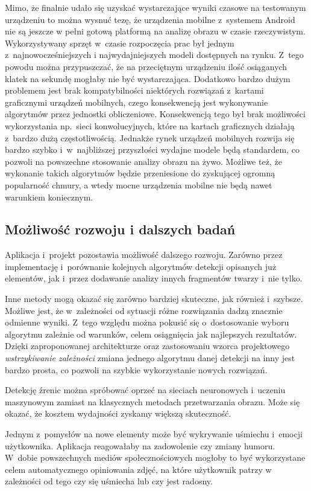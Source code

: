 Mimo, że finalnie udało się uzyskać wystarczające wyniki czasowe na testowanym urządzeniu to można wysnuć tezę, że urządzenia mobilne z~systemem Android nie są jeszcze w pełni gotową platformą na analizę obrazu w czasie rzeczywistym. Wykorzystywany sprzęt w~czasie rozpoczęcia prac był jednym z~najnowocześniejszych i najwydajniejszych modeli dostępnych na rynku. Z~tego powodu można przypuszczać, że na przeciętnym urządzeniu ilość osiąganych klatek na sekundę mogłaby nie być wystarczająca. Dodatkowo bardzo dużym problemem jest brak kompatybilności niektórych rozwiązań z~kartami graficznymi urządzeń mobilnych, czego konsekwencją jest wykonywanie algorytmów przez jednostki obliczeniowe. Konsekwencją tego był brak możliwości wykorzystania np.~sieci konwolucyjnych, które na kartach graficznych działają z~bardzo dużą częstotliwością. Jednakże rynek urządzeń mobilnych rozwija się bardzo szybko i~w~najbliższej przyszłości wydajne modele będą standardem, co pozwoli na powszechne stosowanie analizy obrazu na żywo. Możliwe też, że wykonanie takich algorytmów będzie przeniesione do zyskującej ogromną popularność chmury, a wtedy mocne urządzenia mobilne nie będą nawet warunkiem koniecznym.





\subsection{Możliwość rozwoju i dalszych badań}

Aplikacja i~projekt pozostawia możliwość dalszego rozwoju. Zarówno przez implementację i~porównanie kolejnych algorytmów detekcji opisanych już elementów, jak i~przez dodawanie analizy innych fragmentów twarzy i~nie tylko.

\par

Inne metody mogą okazać się zarówno bardziej skuteczne, jak również i~szybsze. Możliwe jest, że w~zależności od sytuacji różne rozwiązania dadzą znacznie odmienne wyniki. Z~tego względu można pokusić się o~dostosowanie wyboru algorytmu zależnie od warunków, celem osiągnięcia jak najlepszych rezultatów. Dzięki zaproponowanej architekturze oraz zastosowaniu wzorca projektowego \textit{wstrzykiwanie zależności} zmiana jednego algorytmu danej detekcji na inny jest bardzo prosta, co pozwoli na szybkie wykorzystanie nowych rozwiązań.

\par

Detekcję źrenic można spróbować oprzeć na sieciach neuronowych i~uczeniu maszynowym zamiast na klasycznych metodach przetwarzania obrazu. Może się okazać, że kosztem wydajności zyskamy większą skuteczność.

\par

Jednym z~pomysłów na nowe elementy może być wykrywanie uśmiechu i~emocji użytkownika. Aplikacja reagowałaby na zadowolenie czy zmiany humoru. W~dobie powszechnych mediów społecznościowych mogłoby to być wykorzystane celem automatycznego opiniowania zdjęć, na które użytkownik patrzy w zależności od tego czy się uśmiecha lub czy jest radosny.
